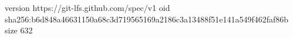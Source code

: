 version https://git-lfs.github.com/spec/v1
oid sha256:b6d848a46631150a68c3d719565169a2186c3a13488f51e141a549f462faf86b
size 632
